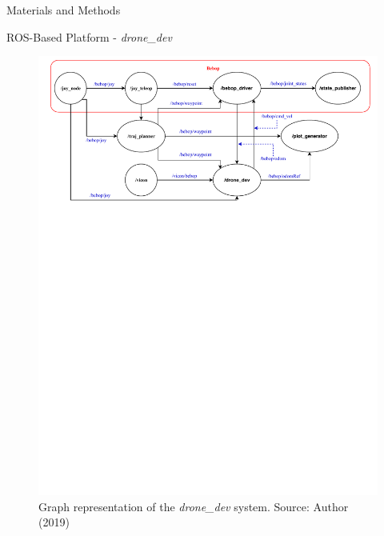 \begin{frame}{Materials and Methods}
\begin{block}{ROS-Based Platform - \textit{drone\_dev}}
\begin{figure}[!h]
	\centering
	\includegraphics[scale=0.55,trim={0cm 18.5cm 0cm 0},clip]{img/rqtGraph01.pdf}
	\caption{Graph representation of the \textit{drone\_dev} system. Source: Author (2019)}\label{fig:rqtGraph}
\end{figure}
\end{block}
\end{frame}


